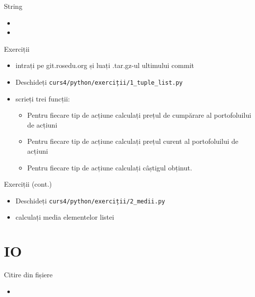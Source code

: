 \documentclass{beamer}
\begin{document}
\begin{frame}{String}
  \begin{itemize}
  \item 
  \item 
  \end{itemize}
\end{frame}

\begin{frame}{Exerciții}
  \begin{itemize}
  \item intrați pe git.rosedu.org și luați .tar.gz-ul ultimului commit
  \item Deschideți \texttt{curs4/python/exerciții/1\_tuple\_list.py}
  \item scrieți trei funcții:
    \begin {itemize}
    \item Pentru fiecare tip de acțiune calculați prețul de cumpărare al portofoluilui de acțiuni
    \item Pentru fiecare tip de acțiune calculați prețul curent al portofoluilui de acțiuni
    \item Pentru fiecare tip de acțiune calculați câștigul obținut.
    \end{itemize}
  \end{itemize}
\end{frame}

\begin{frame}{Exerciții (cont.)}
  \begin{itemize}
  \item Deschideți \texttt{curs4/python/exerciții/2\_medii.py}
  \item calculați media elementelor listei
  \end{itemize}
\end{frame}


\section{IO}
\frame{\tableofcontents[currentsection]}

\begin{frame}{Citire din fișiere}
  \begin{itemize}
  \item \small 
  \end{itemize}
\end{frame}
\end{document}
